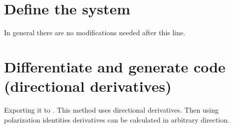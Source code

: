 \documentclass[letterpaper,10pt,english]{jupyterBook}
\begin{document}
\section{Define the system}
\label{\detokenize{SIRmodelGenSym:define-the-system}}
\begin{sphinxVerbatim}[commandchars=\\\{\}]
     
  
  
  
  \PYG{p}{[}  \PYG{p}{]}
\end{sphinxVerbatim}

\sphinxAtStartPar
In general there are no modifications needed after this line.


\section{Differentiate and generate code (directional derivatives)}
\label{\detokenize{SIRmodelGenSym:differentiate-and-generate-code-directional-derivatives}}
\sphinxAtStartPar
Exporting it to . This method uses directional derivatives.
Then using polarization identities derivatives can be calculated in arbitrary
direction.
\end{document}
